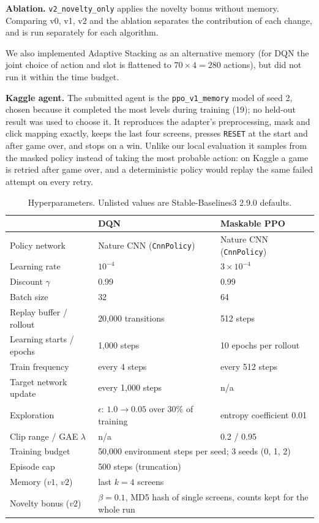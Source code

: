 \documentclass[10pt]{article}
\begin{document}
\textbf{Ablation.} \texttt{v2\_novelty\_only} applies the novelty bonus without memory. Comparing v0, v1, v2 and the ablation separates the contribution of each change, and is run separately for each algorithm.

We also implemented Adaptive Stacking as an alternative memory (for DQN the joint choice of action and slot is flattened to $70\times4=280$ actions), but did not run it within the time budget.

\textbf{Kaggle agent.} The submitted agent is the \texttt{ppo\_v1\_memory} model of seed 2, chosen because it completed the most levels during training (19); no held-out result was used to choose it. It reproduces the adapter's preprocessing, mask and click mapping exactly, keeps the last four screens, presses \texttt{RESET} at the start and after game over, and stops on a win. Unlike our local evaluation it samples from the masked policy instead of taking the most probable action: on Kaggle a game is retried after game over, and a deterministic policy would replay the same failed attempt on every retry.

\begin{table}[t]
\caption{Hyperparameters. Unlisted values are Stable-Baselines3 2.9.0 defaults.}
\label{tab:hyperparameters}
\begin{center}
\small
\begin{tabular}{lll}
\toprule
 & \textbf{DQN} & \textbf{Maskable PPO} \\
\midrule
Policy network & Nature CNN (\texttt{CnnPolicy}) & Nature CNN (\texttt{CnnPolicy}) \\
Learning rate & $10^{-4}$ & $3\times10^{-4}$ \\
Discount $\gamma$ & 0.99 & 0.99 \\
Batch size & 32 & 64 \\
Replay buffer / rollout & 20,000 transitions & 512 steps \\
Learning starts / epochs & 1,000 steps & 10 epochs per rollout \\
Train frequency & every 4 steps & every 512 steps \\
Target network update & every 1,000 steps & n/a \\
Exploration & $\epsilon$: $1.0 \to 0.05$ over 30\% of training & entropy coefficient 0.01 \\
Clip range / GAE $\lambda$ & n/a & 0.2 / 0.95 \\
\midrule
Training budget & \multicolumn{2}{l}{50,000 environment steps per seed; 3 seeds (0, 1, 2)} \\
Episode cap & \multicolumn{2}{l}{500 steps (truncation)} \\
Memory ($v1$, $v2$) & \multicolumn{2}{l}{last $k=4$ screens} \\
Novelty bonus ($v2$) & \multicolumn{2}{l}{$\beta=0.1$, MD5 hash of single screens, counts kept for the whole run} \\
\bottomrule
\end{tabular}
\end{center}
\end{table}
\end{document}

